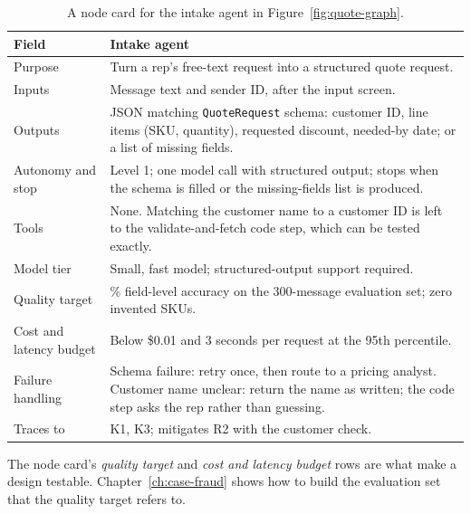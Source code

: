 \begin{table}[htbp]
\centering
\small
\caption{A node card for the intake agent in Figure~\ref{fig:quote-graph}.}
\label{tab:nodecard}
\begin{tabularx}{\textwidth}{@{}>{\raggedright\arraybackslash}p{3cm}>{\raggedright\arraybackslash}X@{}}
\toprule
Field & Intake agent \\
\midrule
Purpose & Turn a rep's free-text request into a structured quote request. \\
Inputs & Message text and sender ID, after the input screen. \\
Outputs & JSON matching \texttt{QuoteRequest} schema: customer ID, line items (SKU, quantity), requested discount, needed-by date; or a list of missing fields. \\
Autonomy and stop & Level 1; one model call with structured output; stops when the schema is filled or the missing-fields list is produced. \\
Tools & None. Matching the customer name to a customer ID is left to the validate-and-fetch code step, which can be tested exactly. \\
Model tier & Small, fast model; structured-output support required. \\
Quality target & 98\% field-level accuracy on the 300-message evaluation set; zero invented SKUs. \\
Cost and latency budget & Below \$0.01 and 3 seconds per request at the 95th percentile. \\
Failure handling & Schema failure: retry once, then route to a pricing analyst. Customer name unclear: return the name as written; the code step asks the rep rather than guessing. \\
Traces to & \textsf{K1}, \textsf{K3}; mitigates \textsf{R2} with the customer check. \\
\bottomrule
\end{tabularx}
\end{table}

The node card's \emph{quality target} and \emph{cost and latency budget} rows are what make a design testable. Chapter~\ref{ch:case-fraud} shows how to build the evaluation set that the quality target refers to.
